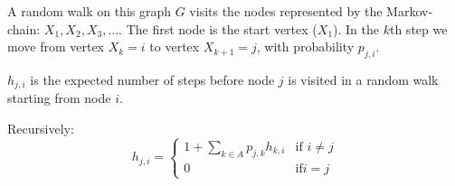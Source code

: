 A random walk on this graph $G$ visits the nodes represented by the Markov-chain: $X_1, X_2, X_3, \dots$. The first node is the start vertex ($X_1$). In the $k$th step we move from vertex $X_k=i$ to vertex $X_{k+1}=j$, with probability $p_{j,i}$.

 $h_{j,i}$ is the expected number of steps before node $j$ is visited in a random walk starting from node $i$.

Recursively:
\[h_{j,i} = \left\{\begin{array}{lr}
1 + \sum\limits_{k\in{}A}p_{j,k}h_{k,i} & \text{if } i\neq{}j\\
0 & \text{if} i=j
\end{array}
\]

